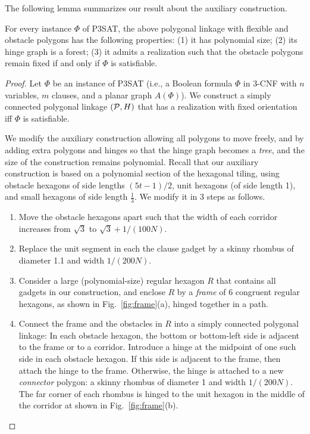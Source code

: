 The following lemma summarizes our result about the auxiliary construction.
\begin{lem}\label{lem:aux}
For every instance $\Phi$ of P3SAT, the above polygonal linkage with flexible and obstacle polygons
has the following properties: (1) it has polynomial size; (2) its hinge graph is a forest;
(3) it admits a realization such that the obstacle polygons remain fixed if and only if $\Phi$ is satisfiable.
\end{lem}
\begin{proof}
Let $\Phi$ be an instance of P3SAT (i.e., a Boolean formula $\Phi$
in 3-CNF with $n$ variables, $m$ clauses, and a planar graph $A(\Phi)$).
We construct a simply connected polygonal linkage $({\cal P},H)$ that has a
realization with fixed orientation iff $\Phi$ is satisfiable.

We modify the auxiliary construction allowing all polygons to move freely, and by adding extra polygons and hinges so that the hinge graph becomes a \emph{tree}, and the size of the construction remains polynomial. Recall that our auxiliary construction is based on a polynomial section of the hexagonal tiling, using obstacle hexagons of side lengths $(5t-1)/2$, unit hexagons (of side length 1), and small hexagons of side length $\frac{1}{3}$. We modify it in 3 steps as follows.

\begin{enumerate}
\item Move the obstacle hexagons apart such that the width of each corridor increases from $\sqrt{3}$ to $\sqrt{3}+1/(100N)$.
\item Replace the unit segment in each the clause gadget by a skinny rhombus of diameter 1.1 and width $1/(200N)$.
\item Consider a large (polynomial-size) regular hexagon $R$ that contains all gadgets in our construction, and enclose $R$ by a \emph{frame} of 6 congruent regular hexagons, as shown in Fig.~\ref{fig:frame}(a), hinged together in a path.
\item Connect the frame and the obstacles in $R$ into a simply connected polygonal linkage: In each obstacle hexagon, the bottom or bottom-left side is adjacent to the frame or to a corridor. Introduce a hinge at the midpoint of one such side in each obstacle hexagon. If this side is adjacent to the frame, then attach the hinge to the frame. Otherwise, the hinge is attached to a new \emph{connector} polygon: a skinny rhombus of diameter 1 and width $1/(200N)$. The far corner of each rhombus is hinged to the unit hexagon in the middle of the corridor at shown in Fig.~\ref{fig:frame}(b).
\end{enumerate}


\end{proof}
